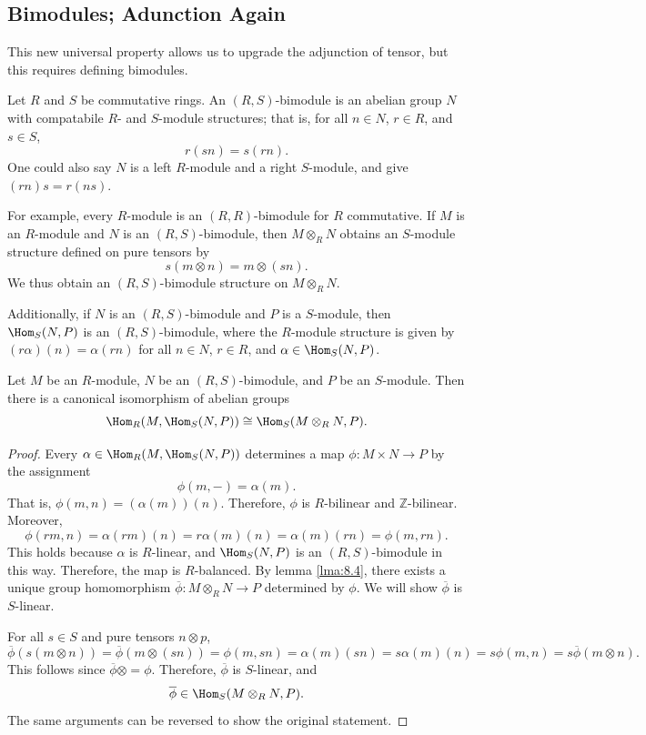 \subsection{Bimodules; Adunction Again}
This new universal property allows us to upgrade the adjunction of tensor, but this requires defining bimodules.
\begin{definition}[Bimodule]\label{dfn:8.12}
	Let $R$ and $S$ be commutative rings. An $(R,S)$-bimodule is an abelian group $N$ with compatabile $R$- and $S$-module structures; that is, for all $n\in N$, $r\in R$, and $s\in S$,
	\[
		r(sn)=s(rn)
	.\]
	One could also say $N$ is a left $R$-module and a right $S$-module, and give $(rn)s=r(ns)$.
\end{definition}

For example, every $R$-module is an $(R,R)$-bimodule for $R$ commutative. If $M$ is an $R$-module and $N$ is an $(R,S)$-bimodule, then $M\otimes _RN$ obtains an $S$-module structure defined on pure tensors by
\[
	s(m\otimes n)=m\otimes (sn)
.\]
We thus obtain an $(R,S)$-bimodule structure on $M\otimes _RN$.

Additionally, if $N$ is an $(R,S)$-bimodule and $P$ is a $S$-module, then $\Hom_{S}(N, P) $ is an $(R,S)$-bimodule, where the $R$-module structure is given by $(r\alpha )(n)=\alpha (rn)$ for all $n\in N$, $r\in R$, and $\alpha \in \Hom_{S}(N, P) $.

\begin{lemma}\label{lma:8.5}
	Let $M$ be an $R$-module, $N$ be an $(R,S)$-bimodule, and $P$ be an $S$-module. Then there is a canonical isomorphism of abelian groups
	\[
		\Hom_{R}(M, \Hom_{S}(N, P) ) \cong \Hom_{S}(M\otimes_R N, P) 
	.\]
\end{lemma}
\begin{proof}
	Every $\alpha \in \Hom_{R}(M, \Hom_{S}(N, P) ) $ determines a map $\phi : M\times N \to P$ by the assignment
	\[
		\phi (m,-)=\alpha(m)
	.\]
	That is, $\phi (m,n)=(\alpha (m))(n)$. Therefore, $\phi $ is $R$-bilinear and $\mathbb{Z} $-bilinear. Moreover,
	\[
		\phi (r m,n)=\alpha (r m)(n)=r\alpha (m)(n)=\alpha (m)(rn)=\phi (m,rn)
	.\]
	This holds because $\alpha $ is $R$-linear, and $\Hom_{S}(N, P) $ is an $(R,S)$-bimodule in this way. Therefore, the map is $R$-balanced. By lemma \ref{lma:8.4}, there exists a unique group homomorphism $\overline{\phi } : M \otimes_R N \to P$ determined by $\phi $. We will show $\overline{\phi } $ is $S$-linear.

	For all $s\in S$ and pure tensors $n \otimes p$,
	\[
		\overline{\phi } \left( s(m\otimes n) \right) =\overline{\phi } (m\otimes (sn))=\phi (m,sn)=\alpha (m)(sn)=s\alpha (m)(n)=s\phi (m,n)=s \overline{\phi } (m \otimes n)
	.\]
	This follows since $\overline{\phi } \otimes =\phi $. Therefore, $\overline{\phi } $ is $S$-linear, and
	\[
		\overline{\phi } \in \Hom_{S}(M\otimes_R N, P) 
	.\]
	The same arguments can be reversed to show the original statement.
\end{proof}

